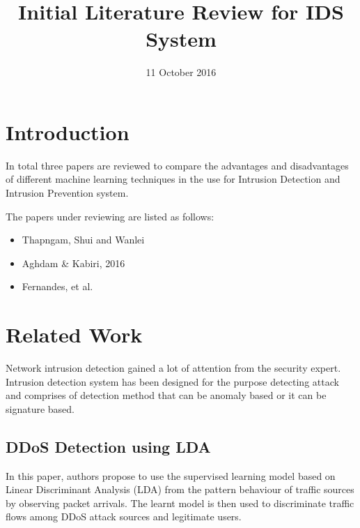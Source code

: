 \documentclass[a4paper]{article}
\title{Initial Literature Review for IDS System }
\author{}
\date{11 October 2016}
\begin{document}
\maketitle
	

\section{Introduction}
In total three papers are reviewed to compare the advantages and disadvantages of different machine learning techniques in the use for Intrusion Detection and Intrusion Prevention system.

The papers under reviewing are listed as follows:
\begin{itemize}
	\item Thapngam, Shui and Wanlei \cite{thapngam2012ddos}
	\item Aghdam \& Kabiri, 2016 \cite{aghdam2016feature}
	\item Fernandes, et al. \cite{fernandes2016network}
\end{itemize}

\section{Related Work}
Network intrusion detection gained a lot of attention from the security expert. Intrusion detection system has been designed for the purpose detecting attack and comprises of detection method that can be anomaly based or it can be signature based. 

\subsection{DDoS Detection using LDA}
In this paper\cite{thapngam2012ddos}, authors propose to use the supervised learning model based on Linear Discriminant Analysis (LDA) from the pattern behaviour of traffic sources by observing packet arrivals. The learnt model is then used to discriminate traffic flows among DDoS attack sources and legitimate users.
\end{document}

